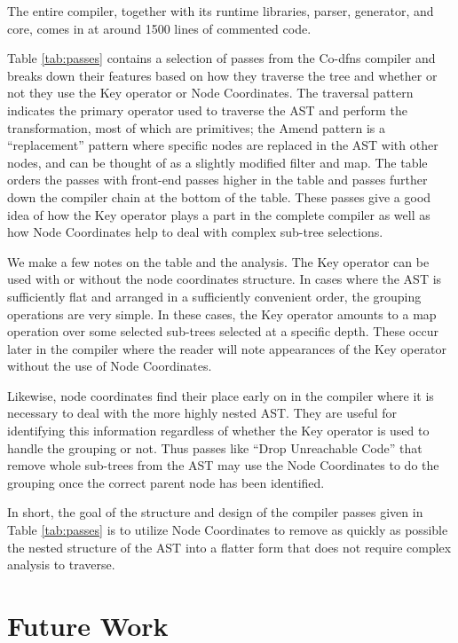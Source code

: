 \documentclass[numbers,9pt]{sigplanconf}
\begin{document}
The entire compiler, together with its runtime libraries, parser, generator, 
and core, comes in at around 1500 lines of commented code. 

Table \ref{tab:passes} contains a selection of passes from the
Co-dfns compiler and breaks down their features based on how they
traverse the tree and whether or not they use the Key operator or
Node Coordinates.
The traversal pattern indicates the primary operator used to traverse the AST 
and perform the transformation, most of which are primitives; the Amend pattern 
is a ``replacement'' pattern where specific nodes are replaced in the AST with 
other nodes, and can be thought of as a slightly modified filter and map.
The table orders the passes with front-end passes higher in
the table and passes further down the compiler chain at the bottom
of the table. These passes give a good idea of how the Key operator
plays a part in the complete compiler as well as how Node Coordinates
help to deal with complex sub-tree selections.

We make a few notes on the table and the analysis. The Key operator
can be used with or without the node coordinates structure. In cases
where the AST is sufficiently flat and arranged in a sufficiently
convenient order, the grouping operations are very simple. In these
cases, the Key operator amounts to a map operation over some selected
sub-trees selected at a specific depth. These occur later in the
compiler where the reader will note appearances of the Key operator
without the use of Node Coordinates.

Likewise, node coordinates find their place early on in the compiler
where it is necessary to deal with the more highly nested AST. They
are useful for identifying this information regardless of whether the
Key operator is used to handle the grouping or not. Thus passes like
``Drop Unreachable Code'' that remove whole sub-trees from the AST
may use the Node Coordinates to do the grouping once the correct
parent node has been identified.

In short, the goal of the structure and design of the compiler passes
given in Table \ref{tab:passes} is to utilize Node Coordinates to
remove as quickly as possible the nested structure of the AST into
a flatter form that does not require complex analysis to traverse.

\section{Future Work}
\end{document}
